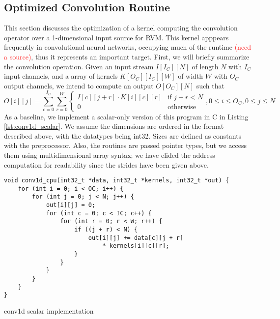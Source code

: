\documentclass[acmsmall, nonacm=true]{acmart}
\begin{document}
\subsection{Optimized Convolution Routine}

This section discusses the optimization of a kernel computing the convolution operator over a 1-dimensional input source for RVM. This kernel apppears frequently in convolutional neural networks, occupying much of the runtime \textcolor{red}{(need a source)}, thus it represents an important target. First, we will briefly summarize the convolution operation. Given an input stream $I[I_C][N]$ of length $N$ with $I_C$ input channels, and a array of kernels $K[O_C][I_C][W]$ of width $W$ with $O_C$ output channels, we intend to compute an output $O[O_C][N]$ such that
$$ O[i][j] = \sum_{c = 0}^{I_C} \sum_{r = 0}^{W} \begin{cases} I[c][j+r] \cdot K[i][c][r] & \text{if } j+r<N \\ 0 & \text{otherwise} \end{cases}, 0 \leq i \leq O_C, 0 \leq j \leq N $$
As a baseline, we implement a scalar-only version of this program in C in Listing \ref{lst:conv1d_scalar}. We assume the dimensions are ordered in the format described above, with the datatypes being int32. Sizes are defined as constants with the preprocessor. Also, the routines are passed pointer types, but we access them using multidimensional array syntax; we have elided the address computation for readability since the strides have been given above.

\begin{listing}
    \centering
    \begin{verbatim}
void conv1d_cpu(int32_t *data, int32_t *kernels, int32_t *out) {
    for (int i = 0; i < OC; i++) {
        for (int j = 0; j < N; j++) {
            out[i][j] = 0;
            for (int c = 0; c < IC; c++) {
                for (int r = 0; r < W; r++) {
                    if ((j + r) < N) {
                        out[i][j] += data[c][j + r]
                            * kernels[i][c][r];
                    }                    
                }
            }
        }
    }
}
\end{verbatim}
    \caption{conv1d scalar implementation}
    \label{lst:conv1d_scalar}
\end{listing}
\end{document}
